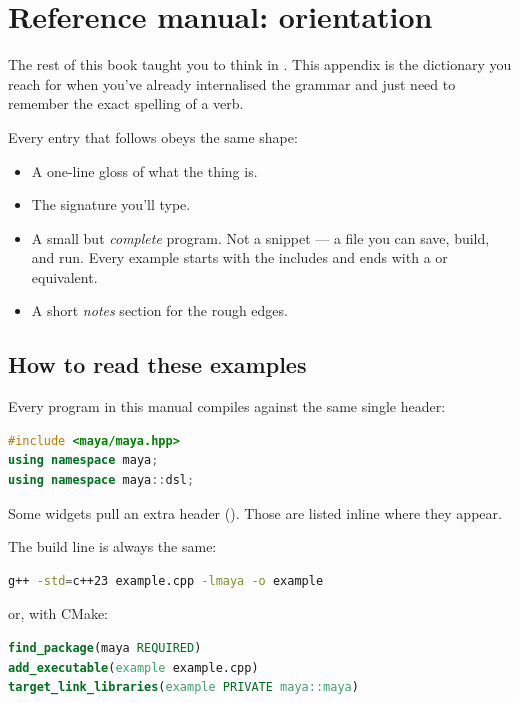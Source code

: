 \chapter{Reference manual: orientation}
\label{ch:refman}

\begin{aside}
The rest of this book taught you to think in \maya{}. This
appendix is the dictionary you reach for when you've already
internalised the grammar and just need to remember the exact
spelling of a verb.
\end{aside}

Every entry that follows obeys the same shape:

\begin{itemize}[leftmargin=*]
  \item A one-line gloss of what the thing is.
  \item The signature you'll type.
  \item A small but \emph{complete} program. Not a snippet —
    a file you can save, build, and run. Every example
    starts with the includes and ends with a 
    or equivalent.
  \item A short \emph{notes} section for the rough edges.
\end{itemize}

\section{How to read these examples}

Every program in this manual compiles against the same
single header:

\begin{lstlisting}[language=C++]
#include <maya/maya.hpp>
using namespace maya;
using namespace maya::dsl;
\end{lstlisting}

Some widgets pull an extra header ().
Those are listed inline where they appear.

The build line is always the same:

\begin{lstlisting}[language=bash]
g++ -std=c++23 example.cpp -lmaya -o example
\end{lstlisting}

\noindent or, with CMake:

\begin{lstlisting}[language=cmake]
find_package(maya REQUIRED)
add_executable(example example.cpp)
target_link_libraries(example PRIVATE maya::maya)
\end{lstlisting}

